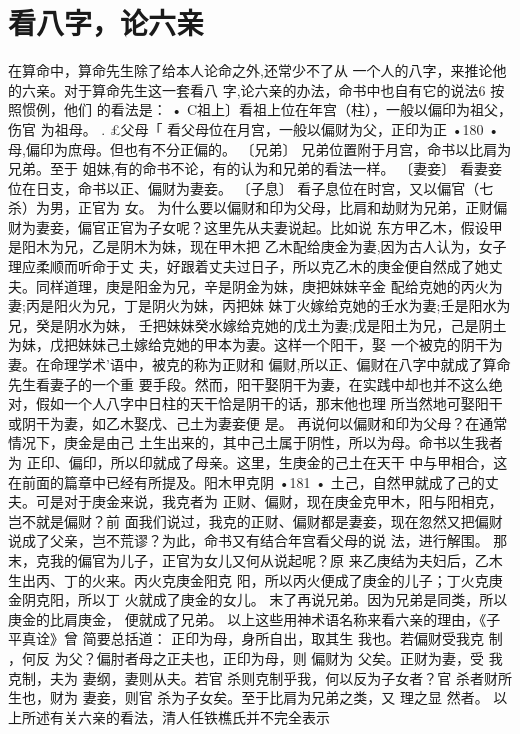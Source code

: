 \section{看八字，论六亲}
在算命中，算命先生除了给本人论命之外,还常少不了从
一个人的八字，来推论他的六亲。对于算命先生这一套看八
字,论六亲的办法，命书中也自有它的说法6 按照惯例，他们
的看法是： •
C祖上〕看祖上位在年宫（柱），一般以偏印为祖父，伤官
为祖母。 .
£父母「 看父母位在月宫，一般以偏财为父，正印为正
•180 •
母,偏印为庶母。但也有不分正偏的。
〔兄弟〕 兄弟位置附于月宫，命书以比肩为兄弟。至于
姐妹,有的命书不论，有的认为和兄弟的看法一样。
〔妻妾〕 看妻妾位在日支，命书以正、偏财为妻妾。
〔子息〕 看子息位在时宫，又以偏官（七杀）为男，正官为
女。
为什么要以偏财和印为父母，比肩和劫财为兄弟，正财偏
财为妻妾，偏官正官为子女呢？这里先从夫妻说起。比如说
东方甲乙木，假设甲是阳木为兄，乙是阴木为妹，现在甲木把
乙木配给庚金为妻,因为古人认为，女子理应柔顺而听命于丈
夫，好跟着丈夫过日子，所以克乙木的庚金便自然成了她丈
夫。同样道理，庚是阳金为兄，辛是阴金为妹，庚把妹妹辛金
配给克她的丙火为妻;丙是阳火为兄，丁是阴火为妹，丙把妹
妹丁火嫁给克她的壬水为妻;壬是阳水为兄，癸是阴水为妹，
壬把妹妹癸水嫁给克她的戊土为妻;戊是阳土为兄，己是阴土
为妹，戊把妹妹己土嫁给克她的甲本为妻。这样一个阳干，娶
一个被克的阴干为妻。在命理学术'语中，被克的称为正财和
偏财,所以正、偏财在八字中就成了算命先生看妻子的一个重
要手段。然而，阳干娶阴干为妻，在实践中却也并不这么绝
对，假如一个人八字中日柱的天干恰是阴干的话，那末他也理
所当然地可娶阳干或阴干为妻，如乙木娶戊、己土为妻妾便
是。
再说何以偏财和印为父母？在通常情况下，庚金是由己
土生出来的，其中己土属于阴性，所以为母。命书以生我者为
正印、偏印，所以印就成了母亲。这里，生庚金的己土在天干
中与甲相合，这在前面的篇章中已经有所提及。阳木甲克阴
•181 •
土己，自然甲就成了己的丈夫。可是对于庚金来说，我克者为
正财、偏财，现在庚金克甲木，阳与阳相克，岂不就是偏财？前
面我们说过，我克的正财、偏财都是妻妾，现在忽然又把偏财
说成了父亲，岂不荒谬？为此，命书又有结合年宫看父母的说
法，进行解围。
那末，克我的偏官为儿子，正官为女儿又何从说起呢？原
来乙庚结为夫妇后，乙木生出丙、丁的火来。丙火克庚金阳克
阳，所以丙火便成了庚金的儿子；丁火克庚金阴克阳，所以丁
火就成了庚金的女儿。
末了再说兄弟。因为兄弟是同类，所以庚金的比肩庚金，
便就成了兄弟。
以上这些用神术语名称来看六亲的理由，《子平真诠》曾
简要总括道：
正印为母，身所自出，取其生 我也。若偏财受我克
制 ，何反 为父？偏肘者母之正夫也，正印为母，则 偏财为
父矣。正财为妻，受 我克制，夫为 妻纲，妻则从夫。若官
杀则克制乎我，何以反为子女者？官 杀者财所生也，财为
妻妾，则官 杀为子女矣。至于比肩为兄弟之类，又 理之显
然者。
以上所述有关六亲的看法，清人任铁樵氏并不完全表示
